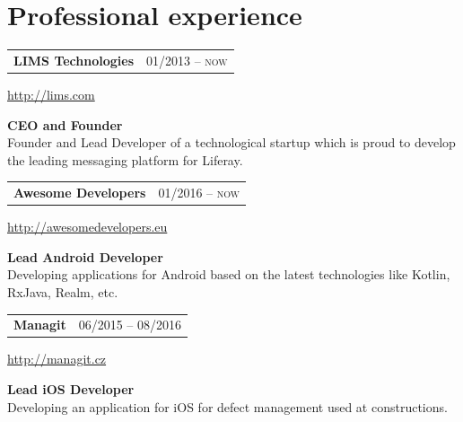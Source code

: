 \documentclass[10pt]{article} %
\begin{document}
\begin{minipage}[t]{0.44\textwidth} %
\vspace{122pt} %
	
	

\section{Professional experience} 
\medskip

\begin{tabularx}{\textwidth}{@{}Xr@{}}
\large\textbf{LIMS Technologies} & \small\textsc{01/2013 -- now} \\
\end{tabularx}
\normalsize\url{http://lims.com}

\medskip
\normalsize\textbf{CEO and Founder}\\
\normalsize {Founder and Lead Developer of a technological startup which is proud to 
develop the leading messaging platform for Liferay.}\\
\medskip 


\begin{tabularx}{\textwidth}{@{}Xr@{}}
\large\textbf{Awesome Developers} & \small\textsc{01/2016 -- now} \\
\end{tabularx}
\normalsize\url{http://awesomedevelopers.eu}

\medskip
\normalsize\textbf{Lead Android Developer}\\
\normalsize {Developing applications for Android based on the latest \newline technologies like Kotlin, RxJava,
Realm, etc.}\\
\medskip 


\begin{tabularx}{\textwidth}{@{}Xr@{}}
\large\textbf{Managit} & \small\textsc{06/2015 -- 08/2016} \\
\end{tabularx}
\normalsize\url{http://managit.cz}

\medskip
\normalsize\textbf{Lead iOS Developer}\\
\normalsize {Developing an application for iOS for \newline defect management used at constructions.}\\
\medskip 


\end{minipage}
\end{document}
